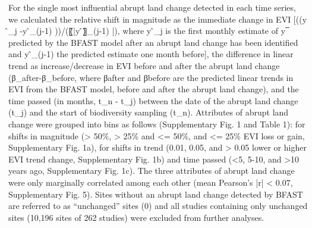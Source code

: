 For the single most influential abrupt land change detected in each time series, we calculated the relative shift in magnitude as the immediate change in EVI [((y ̂_j  -y ̂_(j-1) ))/(〖|y ̂〗_(j-1) |), where y ̂_j is the first monthly estimate of y ̅ predicted by the BFAST model after an abrupt land change has been identified and y ̂_(j-1) the predicted estimate one month before], the difference in linear trend as increase/decrease in EVI before and after the abrupt land change (β_after-β_before, where βafter and βbefore are the predicted linear trends in EVI from the BFAST model, before and after the abrupt land change), and the time passed (in months, t_n - t_j) between the date of the abrupt land change (t_j) and the start of biodiversity sampling (t_n). Attributes of abrupt land change were grouped into bins as follows (Supplementary Fig. 1 and Table 1): for shifts in magnitude (> 50\%, > 25\% and <= 50\%, and <= 25\% EVI loss or gain, Supplementary Fig. 1a), for shifts in trend (0.01, 0.05, and > 0.05 lower or higher EVI trend change, Supplementary Fig. 1b) and time passed (<5, 5-10, and >10 years ago, Supplementary Fig. 1c). The three attributes of abrupt land change were only marginally correlated among each other (mean Pearson’s |r| < 0.07, Supplementary Fig. 5). Sites without an abrupt land change detected by BFAST are referred to as “unchanged” sites (0) and all studies containing only unchanged sites (10,196 sites of 262 studies) were excluded from further analyses.

